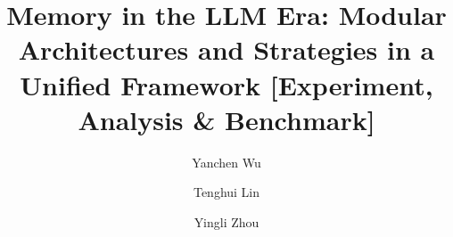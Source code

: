 \documentclass[sigconf,nonacm]{acmart}
\begin{document}
\title{Memory in the LLM Era: Modular Architectures and Strategies in a Unified Framework [Experiment, Analysis \& Benchmark]}









\author{Yanchen Wu}

\author{Tenghui Lin}
\authornotemark[1]

\author{Yingli Zhou}
\end{document}
